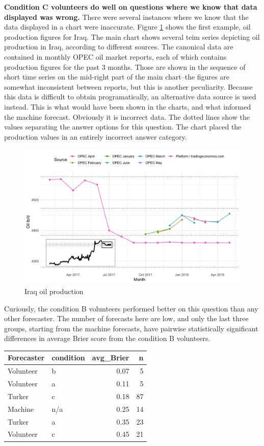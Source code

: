 \documentclass[]{article}
\begin{document}
\textbf{Condition C volunteers do well on questions where we know that
data displayed was wrong.} There were several instances where we know
that the data displayed in a chart were inaccurate. Figure
\ref{fig:iraq} shows the first example, oil production figures for Iraq.
The main chart shows several teim series depicting oil production in
Iraq, according to different sources. The canonical data are contained
in monthly OPEC oil market reports, each of which contains production
figures for the past 3 months. Those are shown in the sequence of short
time series on the mid-right part of the main chart--the figures are
somewhat inconsistent between reports, but this is another peculiarity.
Because this data is difficult to obtain programatically, an alternative
data source is used instead. This is what would have been shown in the
charts, and what informed the machine forecast. Obviously it is
incorrect data. The dotted lines show the values separating the answer
options for this question. The chart placed the production values in an
entirely incorrect answer category.

\begin{figure}
\caption{\label{fig:iraq} Iraq oil production}
\includegraphics{../output/figures/opec-iraq-divergence.png}
\end{figure}

Curiously, the condition B volunteers performed better on this question
than any other forecaster. The number of forecasts here are low, and
only the last three groups, starting from the machine forecasts, have
pairwise statistically significant differences in average Brier score
from the condition B volunteers.

\begin{longtable}[]{@{}llrr@{}}
\toprule
Forecaster & condition & avg\_Brier & n\tabularnewline
\midrule
\endhead
Volunteer & b & 0.07 & 5\tabularnewline
Volunteer & a & 0.11 & 5\tabularnewline
Turker & c & 0.18 & 87\tabularnewline
Machine & n/a & 0.25 & 14\tabularnewline
Turker & a & 0.35 & 23\tabularnewline
Volunteer & c & 0.45 & 21\tabularnewline
\bottomrule
\end{longtable}
\end{document}

